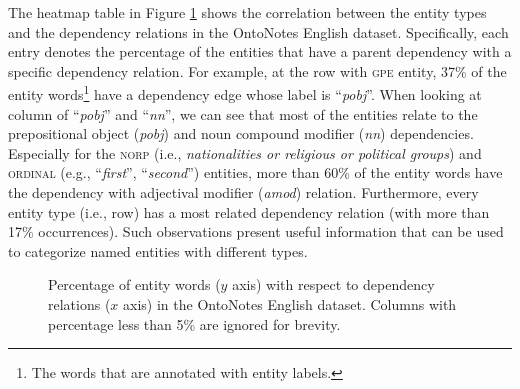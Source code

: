 The heatmap table in Figure \ref{fig:depstat} shows the correlation between the entity types and the dependency relations in the OntoNotes English dataset. 
Specifically, each entry denotes the percentage of the entities that have a parent dependency with a specific dependency relation.  
For example, at the row with \textsc{gpe} entity, 37\% of the entity words\footnote{The words that are annotated with entity labels.} have a dependency edge whose label is ``\textit{pobj}''. 
When looking at column of ``\textit{pobj}'' and ``\textit{nn}'', we can see that most of the entities relate to the prepositional object (\textit{pobj}) and noun compound modifier (\textit{nn}) dependencies. 
Especially for the \textsc{norp} (i.e., {\it nationalities or religious or political groups}) and \textsc{ordinal} (e.g., ``\textit{first}'', ``\textit{second}'') entities, more than 60\% of the entity words have the dependency with  adjectival modifier (\textit{amod}) relation. 
Furthermore, every entity type (i.e., row) has a most related dependency relation (with more than 17\% occurrences). 
Such observations present useful information that can be used to categorize named entities with different types. 

\begin{figure}[h!]
	\centering
	\caption{Percentage of entity words ($y$ axis) with respect to dependency relations ($x$ axis) in the OntoNotes English dataset. Columns with percentage less than 5\% are ignored for brevity.}
	\label{fig:depstat}
\end{figure}

